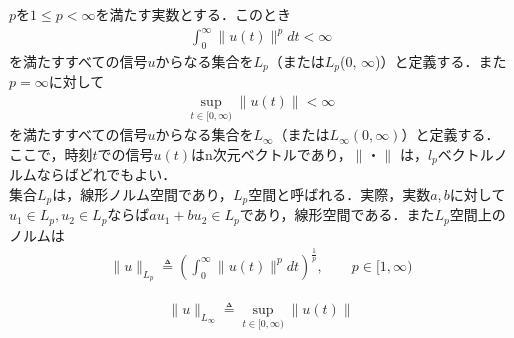 \documentclass[a4paper,11pt,uplatex]{jsarticle} %
\theoremstyle{definition}	%
\begin{document}
$p$を$ 1 \leq p < \infty$を満たす実数とする．このとき
\begin{align}
\label{definition of L_p}
\int_{0}^\infty \| u(t) \|^p dt < \infty
\end{align}
を満たすすべての信号$u$からなる集合を$L_p$（または$L_p$(0, $\infty$)）と定義する．また$ p = \infty $に対して
\begin{align}
\label{definition of L_infty}
\sup_{t \in [0, \infty)} \| u(t) \| < \infty
\end{align}
を満たすすべての信号$u$からなる集合を$L_\infty$（または$L_\infty(0,\infty)$）と定義する．ここで，時刻$t$での信号$u(t)$はn次元ベクトルであり，$\| ・ \|$
は，$l_p$ベクトルノルムならばどれでもよい．\\
集合$L_p$は，線形ノルム空間であり，$L_p$空間と呼ばれる．実際，実数$a,b$に対して$ u_1 \in L_p , u_2 \in L_p $ならば$au_1 + bu_2 \in L_p $であり，線形空間である．また$L_p$空間上のノルムは
\begin{align}
\label{norm of L_p}
\| u \|_{L_p} \triangleq ( \int^\infty_0 \| u(t) \|^p dt )^{\frac{1}{p}},\qquad  p \in [1, \infty) 
\end{align}

\begin{align}
\label{norm of L_infty}
\| u \|_{L_\infty} \triangleq \sup_{t \in [0, \infty)} \| u(t) \|
\end{align}
\end{document}
